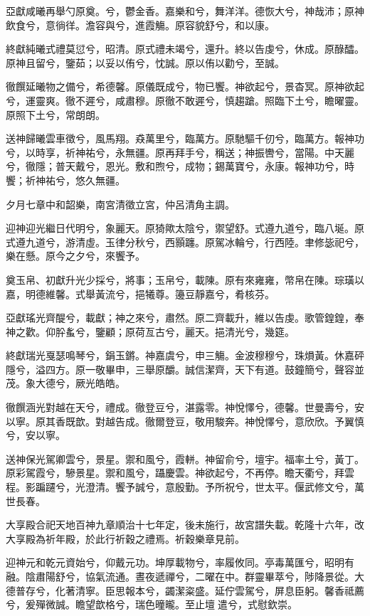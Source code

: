 \begin{pinyinscope}
亞獻咸曦再舉勺原奠。兮，鬱金香。嘉樂和兮，舞洋洋。德恢大兮，神哉沛；原神飲食兮，意徜徉。澹容與兮，進霞觴。原容貌舒兮，和以康。

終獻純曦式禮莫愆兮，昭清。原式禮未竭兮，還升。終以告虔兮，休成。原醁醽。原神且留兮，鑒茹；以妥以侑兮，忱誠。原以侑以勸兮，至誠。

徹饌延曦物之備兮，希德馨。原儀既成兮，物已饗。神欲起兮，景杳冥。原神欲起兮，運靈爽。徹不遲兮，咸肅穆。原徹不敢遲兮，慎趨蹌。照臨下土兮，瞻曜靈。原照下土兮，常朗朗。

送神歸曦雲車徵兮，風馬翔。猋萬里兮，臨萬方。原馳驅千仞兮，臨萬方。報神功兮，以時享，祈神祐兮，永無疆。原再拜手兮，稱送；神振轡兮，當陽。中天麗兮，徹隱；普天戴兮，恩光。敷和煦兮，成物；錫萬寶兮，永康。報神功兮，時饗；祈神祐兮，悠久無疆。

夕月七章中和韶樂，南宮清徵立宮，仲呂清角主調。

迎神迎光繼日代明兮，象麗天。原猗歟太陰兮，禦望舒。式遵九道兮，臨八埏。原式遵九道兮，游清虛。玉律分秋兮，西顥躔。原駕冰輪兮，行西陸。聿修毖祀兮，樂在懸。原今之夕兮，來饗予。

奠玉帛、初獻升光少採兮，將事；玉帛兮，載陳。原有來雍雍，幣帛在陳。琮璜以嘉，明德維馨。式舉黃流兮，挹犧尊。籩豆靜嘉兮，肴核芬。

亞獻瑤光齊醍兮，載獻；神之來兮，肅然。原二齊載升，維以告虔。歌管鍠鍠，奉神之歡。仰肸蚃兮，鑒顧；原荷亙古兮，麗天。挹清光兮，幾筵。

終獻瑞光戛瑟鳴琴兮，鋗玉鏘。神嘉虞兮，申三觴。金波穆穆兮，珠熉黃。休嘉砰隱兮，溢四方。原一敬畢申，三舉原釂。誠信潔齊，天下有道。鼓鐘簡兮，聲容並茂。象大德兮，厥光皓皓。

徹饌涵光對越在天兮，禮成。徹登豆兮，湛露零。神悅懌兮，德馨。世曼壽兮，安以寧。原其香既歆。對越告成。徹爾登豆，敬用駿奔。神悅懌兮，意欣欣。予翼慎兮，安以寧。

送神保光駕卿雲兮，景星。禦和風兮，霞軿。神留俞兮，壇宇。福率土兮，黃丁。原彩駕霞兮，驂景星。禦和風兮，躡慶雲。神欲起兮，不再停。瞻天衢兮，拜雲程。影蹁躚兮，光澄清。饗予誠兮，意殷勤。予所祝兮，世太平。偃武修文兮，萬世長春。

大享殿合祀天地百神九章順治十七年定，後未施行，故宮譜失載。乾隆十六年，改大享殿為祈年殿，於此行祈穀之禮焉。祈穀樂章見前。

迎神元和乾元資始兮，仰戴元功。坤厚載物兮，率履攸同。亭毒萬匯兮，昭明有融。陰肅陽舒兮，協氣流通。晝夜遞禪兮，二曜在中。群靈畢萃兮，陟降景從。大德普存兮，化著清寧。臣思報本兮，蠲潔粢盛。延佇雲駕兮，屏息臣躬。馨香祗薦兮，爰殫微誠。瞻望歆格兮，瑞色曈曨。至止壇遣兮，式慰欽崇。


\end{pinyinscope}
